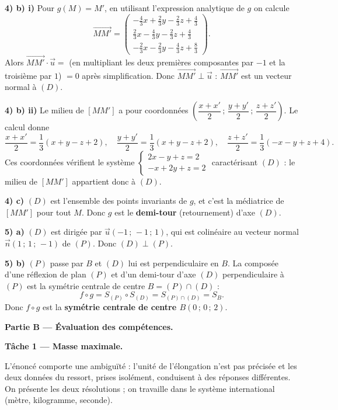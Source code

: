 \noindent\textbf{4) b) i)} Pour $g(M)=M'$, en utilisant l'expression analytique de $g$ on calcule
\[
\overrightarrow{MM'}=\begin{pmatrix}-\tfrac43x+\tfrac23y-\tfrac23z+\tfrac43\\[2pt]
\tfrac23x-\tfrac43y-\tfrac23z+\tfrac43\\[2pt]
-\tfrac23x-\tfrac23y-\tfrac43z+\tfrac83\end{pmatrix}.
\]
Alors $\overrightarrow{MM'}\cdot\vec u=$ (en multipliant les deux premières composantes par $-1$ et
la troisième par $1$) $=0$ après simplification. Donc $\overrightarrow{MM'}\perp\vec u$ :
$\overrightarrow{MM'}$ est un vecteur normal à $(D)$.

\noindent\textbf{4) b) ii)} Le milieu de $[MM']$ a pour coordonnées
$\left(\dfrac{x+x'}{2}\,;\,\dfrac{y+y'}{2}\,;\,\dfrac{z+z'}{2}\right)$. Le calcul donne
\[
\frac{x+x'}{2}=\frac13(x+y-z+2),\quad
\frac{y+y'}{2}=\frac13(x+y-z+2),\quad
\frac{z+z'}{2}=\frac13(-x-y+z+4).
\]
Ces coordonnées vérifient le système $\begin{cases}2x-y+z=2\\ -x+2y+z=2\end{cases}$ caractérisant
$(D)$ : le milieu de $[MM']$ appartient donc à $(D)$.

\noindent\textbf{4) c)} $(D)$ est l'ensemble des points invariants de $g$, et c'est la médiatrice
de $[MM']$ pour tout $M$. Donc $g$ est le \textbf{demi-tour} (retournement) d'axe $(D)$.

\noindent\textbf{5) a)} $(D)$ est dirigée par $\vec u(-1\,;\,-1\,;\,1)$, qui est colinéaire au
vecteur normal $\vec n(1\,;\,1\,;\,-1)$ de $(P)$. Donc $(D)\perp(P)$.

\noindent\textbf{5) b)} $(P)$ passe par $B$ et $(D)$ lui est perpendiculaire en $B$. La composée
d'une réflexion de plan $(P)$ et d'un demi-tour d'axe $(D)$ perpendiculaire à $(P)$ est la
symétrie centrale de centre $B=(P)\cap(D)$ :
\[
f\circ g=S_{(P)}\circ S_{(D)}=S_{(P)\cap(D)}=S_B.
\]
Donc $f\circ g$ est la \textbf{symétrie centrale de centre $B(0\,;\,0\,;\,2)$}.

\bigskip
\noindent\textbf{Partie B — Évaluation des compétences.}

\smallskip
\noindent\textbf{Tâche 1 — Masse maximale.}
\begin{remarque}
L'énoncé comporte une ambiguïté : l'unité de l'élongation n'est pas précisée et les deux données
du ressort, prises isolément, conduisent à des réponses différentes. On présente les deux
résolutions ; on travaille dans le système international (mètre, kilogramme, seconde).
\end{remarque}

